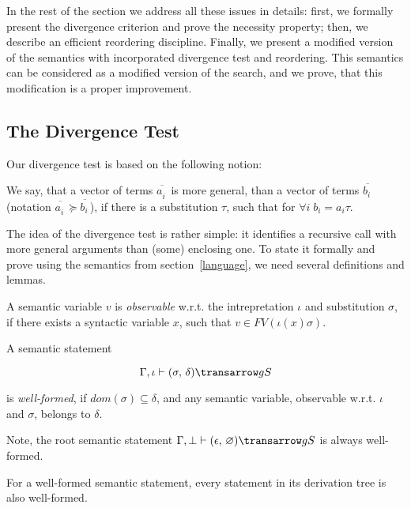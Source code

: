 In the rest of the section we address all these issues in details: first, we formally present the divergence
criterion and prove the necessity property; then, we describe an efficient reordering discipline. Finally, we present a
modified version of the semantics with incorporated divergence test and reordering. This semantics can be
considered as a modified version of the search, and we prove, that this modification is a proper improvement.

\subsection{The Divergence Test}

Our divergence test is based on the following notion:

\begin{definition}
\normalfont 
We say, that a vector of terms $\overline{a^{\phantom{x}}_i}$ is more general, than a vector of terms $\overline{b^{\phantom{x}}_i}$ (notation 
$\overline{a^{\phantom{x}}_i}\succeq\overline{b^{\phantom{x}}_i}$), if there is a substitution $\tau$, such that for $\forall i\;b_i = a_i \tau$.
\end{definition}

The idea of the divergence test is rather simple: it identifies a recursive call with more general arguments 
than (some) enclosing one. To state it formally and prove using the semantics from section~\ref{language}, we need several definitions and lemmas.

\begin{definition}
\normalfont
A semantic variable $v$ is \emph{observable} w.r.t. the intrepretation $\iota$ and substitution $\sigma$, if there exists 
a syntactic variable $x$, such that \mbox{$v \in FV(\iota(x) \sigma)$}.
\end{definition}

\begin{definition}
\normalfont
A semantic statement 

$$
\otrans{\Gamma,\iota}{(\sigma,\,\delta)}{g}{S}
$$ 

\noindent is \emph{well-formed}, if \mbox{$dom(\sigma) \subseteq \delta$}, and any semantic variable, observable w.r.t. $\iota$ and $\sigma$, belongs to $\delta$.  
\end{definition}

Note, the root semantic statement \mbox{$\otrans{\Gamma,\bot}{(\epsilon,\,\emptyset)}{g}{S}$} is always well-formed.

\begin{lemma}
\label{one}
\normalfont
 For a well-formed semantic statement, every statement in its derivation tree is also well-formed.
\end{lemma}

